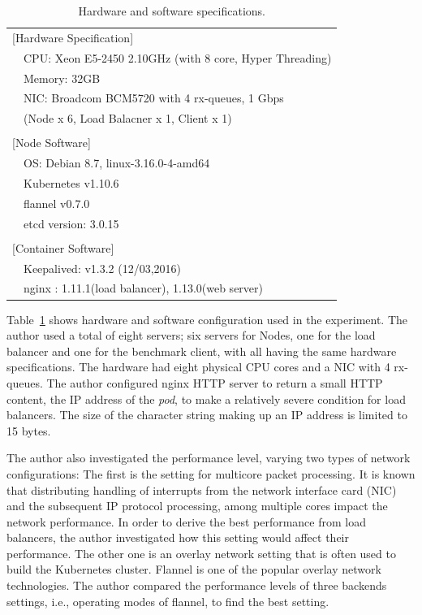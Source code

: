 {
\setlength{\tabcolsep}{3em}
\renewcommand{\arraystretch}{1.1}

\begin{table}[h]
  \centering
  \begin{tabular}{ll}
    \hline 
    \multicolumn{2}{l}{[Hardware Specification]}   \\
    & CPU: Xeon E5-2450 2.10GHz (with 8 core, Hyper Threading) \\
    & Memory: 32GB \\
    & NIC: Broadcom BCM5720 with 4 rx-queues, 1 Gbps \\
    & (Node x 6, Load Balacner x 1, Client x 1) \\
    & \\
    \multicolumn{2}{l}{[Node Software]}  \\
    & OS: Debian 8.7, linux-3.16.0-4-amd64 \\
    & Kubernetes v1.10.6 \\
    & flannel v0.7.0 \\
    & etcd version: 3.0.15 \\
    & \\
    \multicolumn{2}{l}{[Container Software]}   \\
    & Keepalived: v1.3.2 (12/03,2016) \\
    & nginx : 1.11.1(load balancer), 1.13.0(web server) \\
    \hline
  \end{tabular}
  \caption[Hardware and software specifications]{Hardware and software specifications.}
    \label{tab:hw_machine_spec}
\end{table}
}

Table~\ref{tab:hw_machine_spec} shows hardware and software configuration used in the experiment.
The author used a total of eight servers; six servers for Nodes, one for the load balancer and one for the benchmark client, with all having the same hardware specifications.
The hardware had eight physical CPU cores and a NIC with 4 rx-queues.
The author configured nginx HTTP server to return a small HTTP content, the IP address of the {\em pod}, to make a relatively severe condition for load balancers. 
The size of the character string making up an IP address is limited to 15 bytes.

The author also investigated the performance level, varying two types of network configurations:
The first is the setting for multicore packet processing.
It is known that distributing handling of interrupts from the network interface card (NIC) and the subsequent IP protocol processing, among multiple cores impact the network performance.
In order to derive the best performance from load balancers, the author investigated how this setting would affect their performance.
The other one is an overlay network setting\cite{Sill2016,Marmol2015} that is often used to build the Kubernetes cluster.
Flannel\cite{CoreOSFlannel} is one of the popular overlay network technologies. 
The author compared the performance levels of three backends settings\cite{CoreOSFlannelBackend}, i.e., operating modes of flannel, to find the best setting.

